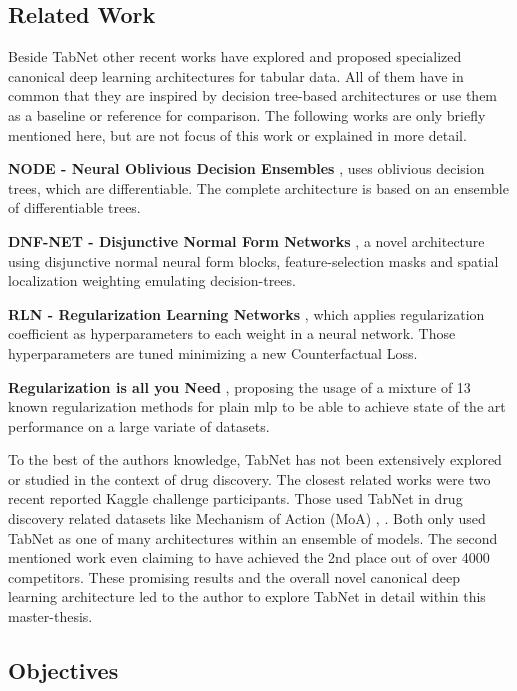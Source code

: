 \documentclass[../main.tex]{subfiles}
\begin{document}
\subsection{Related Work}

Beside TabNet other recent works have explored and proposed specialized canonical deep learning architectures for tabular data. All of them have in common that they are inspired by decision tree-based architectures or use them as a baseline or reference for comparison. The following works are only briefly mentioned here, but are not focus of this work or explained in more detail.
\par
\textbf{NODE - Neural Oblivious Decision Ensembles} \cite{popov_neural_2019}, uses oblivious decision trees, which are differentiable. The complete architecture is based on an ensemble of differentiable trees.
\par
\textbf{DNF-NET - Disjunctive Normal Form Networks} \cite{abutbul_dnf-net_2020}, a novel architecture using disjunctive normal neural form blocks, feature-selection masks and spatial localization weighting emulating decision-trees.
\par
\textbf{RLN - Regularization Learning Networks} \cite{shavitt_regularization_2018}, which applies regularization coefficient as hyperparameters to each weight in a neural network. Those hyperparameters are tuned minimizing a new Counterfactual Loss. 
\par
\textbf{Regularization is all you Need} \cite{kadra_regularization_2021}, proposing the usage of a mixture of 13 known regularization methods for plain \ac{mlp} to be able to achieve state of the art performance on a large variate of datasets.
\newline

To the best of the authors knowledge, TabNet has not been extensively explored or studied in the context of drug discovery. The closest related works were two recent reported Kaggle challenge participants. Those used TabNet in drug discovery related datasets like Mechanism of Action (MoA) \cite{alessandro_mechanism_nodate}, \cite{baosenguo_kaggle-moa_2021}. Both only used TabNet as one of many architectures within an ensemble of models. The second mentioned work even claiming to have achieved the 2nd place out of over 4000 competitors. These promising results and the overall novel canonical deep learning architecture led to the author to explore TabNet in detail within this master-thesis.


\subsection{Objectives} \label{ssec:objectives}
\end{document}
